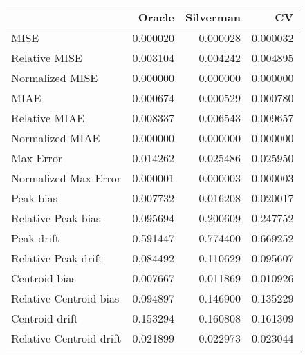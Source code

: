 \begin{tabular}{lrrr}
  \hline
 & Oracle & Silverman & CV \\ 
  \hline
MISE & 0.000020 & 0.000028 & 0.000032 \\ 
  Relative MISE & 0.003104 & 0.004242 & 0.004895 \\ 
  Normalized MISE & 0.000000 & 0.000000 & 0.000000 \\ 
  MIAE & 0.000674 & 0.000529 & 0.000780 \\ 
  Relative MIAE & 0.008337 & 0.006543 & 0.009657 \\ 
  Normalized MIAE & 0.000000 & 0.000000 & 0.000000 \\ 
  Max Error & 0.014262 & 0.025486 & 0.025950 \\ 
  Normalized Max Error & 0.000001 & 0.000003 & 0.000003 \\ 
  Peak bias & 0.007732 & 0.016208 & 0.020017 \\ 
  Relative Peak bias & 0.095694 & 0.200609 & 0.247752 \\ 
  Peak drift & 0.591447 & 0.774400 & 0.669252 \\ 
  Relative Peak drift & 0.084492 & 0.110629 & 0.095607 \\ 
  Centroid bias & 0.007667 & 0.011869 & 0.010926 \\ 
  Relative Centroid bias & 0.094897 & 0.146900 & 0.135229 \\ 
  Centroid drift & 0.153294 & 0.160808 & 0.161309 \\ 
  Relative Centroid drift & 0.021899 & 0.022973 & 0.023044 \\ 
   \hline
\end{tabular}
